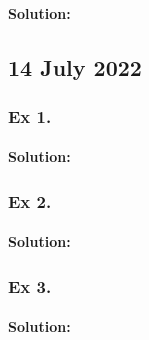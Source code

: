 	\paragraph{Solution:}
	
	\newpage
	\subsection{14 July 2022}	

\subsubsection{Ex 1.}	
	\configuratedText{
	\begin{enumerate}
	\item 
	\item
	\item 
	\end{enumerate}}

	\paragraph{Solution:}
		
	\subsubsection{Ex 2.}	
	\configuratedText{
	\begin{enumerate}
	\item 
	\item
	\item 
	\end{enumerate}}

	\paragraph{Solution:}
		
	\subsubsection{Ex 3.}	
	\configuratedText{
	\begin{enumerate}
	\item 
	\item
	\item 
	\end{enumerate}}

	\paragraph{Solution:}
		
